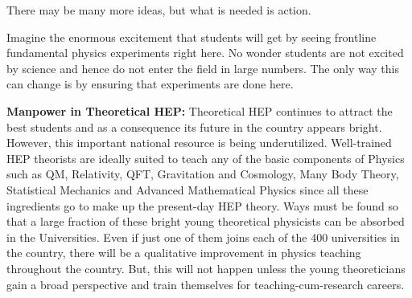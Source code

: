 There may be many more ideas, but what is needed is action. 


Imagine the enormous excitement that students will get by seeing frontline fundamental physics experiments right here. No wonder students are not
excited by science and hence do not enter the field in large numbers. The
only way this can change is by ensuring that experiments are done here. 

\textbf{Manpower in Theoretical HEP:} Theoretical HEP continues to attract
the best students and as a consequence its future in the country appears
bright. However, this important national resource is being underutilized.
Well-trained HEP theorists are ideally suited to teach any of the basic components of Physics such as QM, Relativity, QFT, Gravitation and Cosmology, Many Body Theory, Statistical Mechanics and Advanced Mathematical
Physics since all these ingredients go to make up the present-day HEP theory.
Ways must be found so that a large fraction of these bright young theoretical physicists can be absorbed in the Universities. Even if just one of them
joins each of the 400 universities in the country, there will be a qualitative
improvement in physics teaching throughout the country. But, this will not
happen unless the young theoreticians gain a broad perspective and train
themselves for teaching-cum-research careers. 

